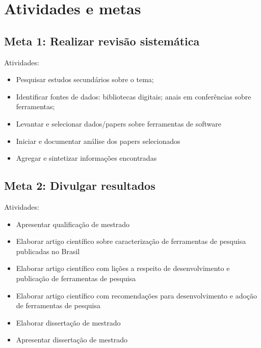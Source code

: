 \documentclass[12pt]{article}
\begin{document}
\section{Atividades e metas}

\subsection{Meta 1: Realizar revisão sistemática}

Atividades:

\begin{itemize}
  \item Pesquisar estudos secundários sobre o tema;
  \item Identificar fontes de dados: bibliotecas digitais; anais em
    conferências sobre ferramentas;
  \item Levantar e selecionar dados/papers sobre ferramentas de software
  \item Iniciar e documentar análise dos papers selecionados
  \item Agregar e sintetizar informações encontradas
\end{itemize}

\subsection{Meta 2: Divulgar resultados}

Atividades:

\begin{itemize}
  \item Apresentar qualificação de mestrado
  \item Elaborar artigo científico sobre caracterização de ferramentas de pesquisa publicadas no Brasil
  \item Elaborar artigo científico com lições a respeito de desenvolvimento e publicação de ferramentas de pesquisa
  \item Elaborar artigo científico com recomendações para desenvolvimento e adoção de ferramentas de pesquisa
  \item Elaborar dissertação de mestrado
  \item Apresentar dissertação de mestrado
\end{itemize}


\end{document}
